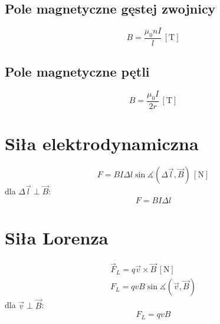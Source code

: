 \documentclass{report}
\numberwithin{equation}{chapter}
\newcommand{\unit}[1]{\,\left[\mathrm{#1}\right]}
\begin{document}
      \subsection{Pole magnetyczne gęstej zwojnicy}
        \begin{equation}
          B = \frac{\mu_0 nI}{l} \unit{T}
        \end{equation}
      \subsection{Pole magnetyczne pętli}
        \begin{equation}
          B = \frac{\mu_0 I}{2r} \unit{T}
        \end{equation}
    \section{Siła elektrodynamiczna}
      \begin{equation}
        F = BI\Delta l\sin\measuredangle(\Delta\vec l, \vec B) \unit{N}
      \end{equation}
      dla $\Delta\vec l \perp \vec B$:
      \begin{equation}
        F = BI\Delta l
      \end{equation}
  \section{Siła Lorenza}
    \begin{gather}
      \vec F_L = q\vec v\times\vec B \unit{N}\\
      F_L = qvB\sin\measuredangle(\vec v, \vec B)
    \end{gather}
    dla $\vec v\perp\vec B$:
    \begin{equation}
      F_L = qvB
    \end{equation}
\end{document}
